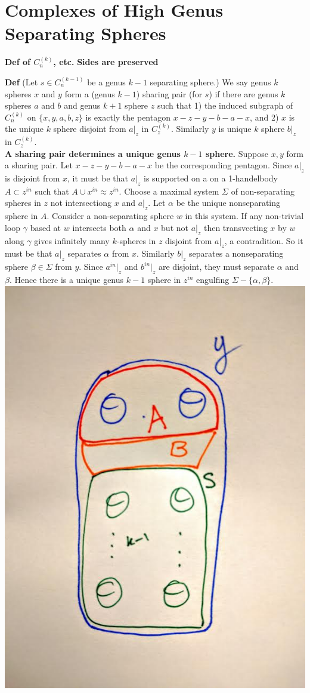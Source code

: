 \documentclass[12pt]{article}
\begin{document}
\section{Complexes of High Genus Separating Spheres}

\noindent \textbf{Def of $C_n^{(k)}$, etc.}
\noindent \textbf{Sides are preserved}

\noindent \textbf{Def}
(Let $s \in C_n^{(k-1)}$ be a genus $k-1$ separating sphere.)
We say genus $k$ spheres $x$ and $y$ form a (genus $k-1$) sharing pair (for $s$) if there are genus $k$ spheres $a$ and $b$ and genus $k+1$ sphere $z$ such that 1) the induced subgraph of $C_n^{(k)}$ on $\{x,y,a,b,z\}$ is exactly the pentagon $x - z - y - b - a - x$, and 2) $x$ is the unique $k$ sphere disjoint from $a|_z$ in $C_z^{(k)}$. Similarly $y$ is unique $k$ sphere $b|_z$  in $C_z^{(k)}$.\\



\noindent \textbf{A sharing pair determines a unique genus $k-1$ sphere.}
Suppose $x,y$ form a sharing pair. Let $x-z-y-b-a-x$ be the corresponding pentagon.
Since $a|_z$ is disjoint from $x$, it must be that $a|_z$ is supported on a on a 1-handelbody $A \subset z^{in}$ such that $A \cup x^{in} \approx z^{in}$. 
Choose a maximal system $\Sigma$ of non-separating spheres in $z$ not intersectiong $x$ and $a|_z$.
Let $\alpha$ be the unique nonseparating sphere in $A$.
Consider a non-separating sphere $w$ in this system.
If any non-trivial loop $\gamma$ based at $w$ intersects both $\alpha$ and $x$ but not $a|_z$ then transvecting $x$ by $w$ along $\gamma$ gives infinitely many $k$-spheres in $z$ disjoint from $a|_z$, a contradition.
So it must be that $a|_z$ separates $\alpha$ from $x$.
Similarly $b|_z$ separates a nonseparating sphere $\beta \in \Sigma$ from $y$.
Since $a^{in}|_z$ and $b^{in}|_z$ are disjoint, they must separate $\alpha$ and $\beta$.
Hence there is a unique genus $k-1$ sphere in $z^{in}$ engulfing $\Sigma -\{\alpha, \beta\}$.\\

\includegraphics[width=.4\textwidth]{minintersect.jpg}
\end{document}
